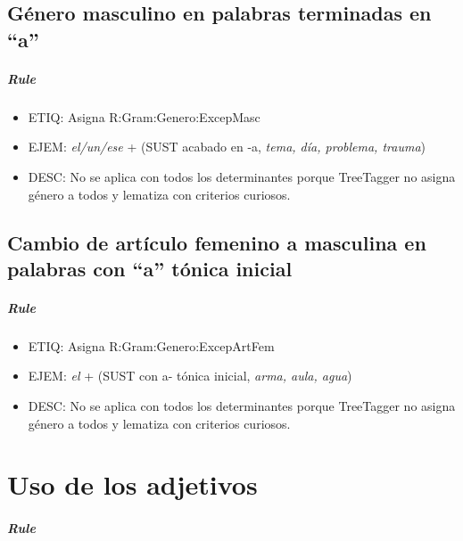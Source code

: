 \documentclass[11pt]{report}
\begin{document}
\section{Género masculino en palabras terminadas en ``a''}
\paragraph*{Rule}
\begin{itemize}
\item ETIQ: Asigna R:Gram:Genero:ExcepMasc
\item EJEM: \emph{el/un/ese} + (SUST acabado en -a, \emph{tema, día, problema, trauma})
\item DESC: No se aplica con todos los determinantes porque TreeTagger no asigna género a todos y lematiza con criterios curiosos.
\end{itemize}

\section{Cambio de artículo femenino a masculina en palabras con ``a'' tónica inicial}
\paragraph*{Rule}
\begin{itemize}
\item ETIQ: Asigna R:Gram:Genero:ExcepArtFem
\item EJEM: \emph{el} + (SUST con a- tónica inicial, \emph{arma, aula, agua})
\item DESC: No se aplica con todos los determinantes porque TreeTagger no asigna género a todos y lematiza con criterios curiosos.
\end{itemize}

\chapter{Uso de los adjetivos}
\paragraph*{Rule}
\end{document}
